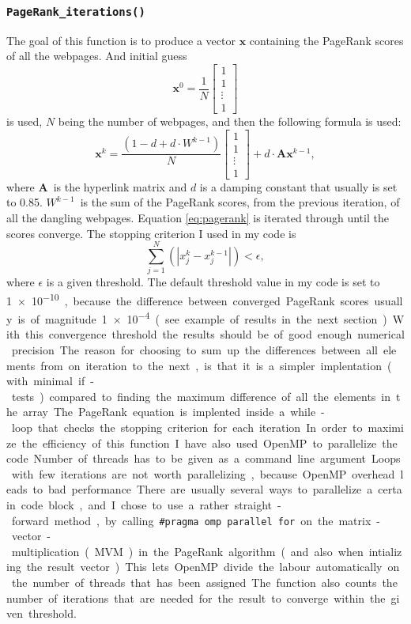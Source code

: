 \documentclass[10pt, a4paper]{amsart}
\numberwithin{figure}{section}
\numberwithin{table}{section}
\begin{document}
\subsubsection{\texttt{PageRank\_iterations()}}
The goal of this function is to produce a vector $\mathbf{x}$ containing the PageRank scores of all the webpages. And initial guess
\begin{equation}
    \mathbf{x}^0 = \frac{1}{N}\begin{bmatrix}1 \\ 1 \\ \vdots \\ 1\end{bmatrix}
\end{equation}
is used, $N$ being the number of webpages, and then the following formula is used:
\begin{equation}
    \mathbf{x}^k = \frac{(1 - d + d \cdot W^{k-1})}{N}\begin{bmatrix}1 \\ 1 \\ \vdots \\ 1\end{bmatrix} + d \cdot \mathbf{A}\mathbf{x}^{k-1},
    \label{eq:pagerank}
\end{equation}
where $\mathbf{A}$ is the hyperlink matrix and $d$ is a damping constant that usually is set to 0.85. $W^{k-1}$ is the sum of the PageRank scores, from the previous iteration, of all the dangling webpages. Equation \ref{eq:pagerank} is iterated through until the scores converge. The stopping criterion I used in my code is
\begin{equation}
    \sum_{j=1}^{N} \left( |x_j^k - x_j^{k-1}| \right) < \epsilon,
\end{equation}
where $\epsilon$ is a given threshold. The default threshold value in my code is set to \SI{1e-10}, because the difference between converged PageRank scores usually is of magnitude \SI{1e-4} (see example of results in the next section). With this convergence threshold the results should be of good enough numerical precision. The reason for choosing to sum up the differences between all elements from on iteration to the next, is that it is a simpler implentation (with minimal if-tests) compared to finding the maximum difference of all the elements in the array.

The PageRank equation is implented inside a while-loop that checks the stopping criterion for each iteration. In order to maximize the efficiency of this function I have also used OpenMP to parallelize the code. Number of threads has to be given as a command line argument. Loops with few iterations are not worth parallelizing, because OpenMP overhead leads to bad performance. There are usually several ways to parallelize a certain code block, and I chose to use a rather straight-forward method, by calling \texttt{\#pragma omp parallel for} on the matrix-vector-multiplication (MVM) in the PageRank algorithm (and also when intializing the result vector). This lets OpenMP divide the labour automatically on the number of threads that has been assigned. The function also counts the number of iterations that are needed for the result to converge within the given threshold.
\end{document}

